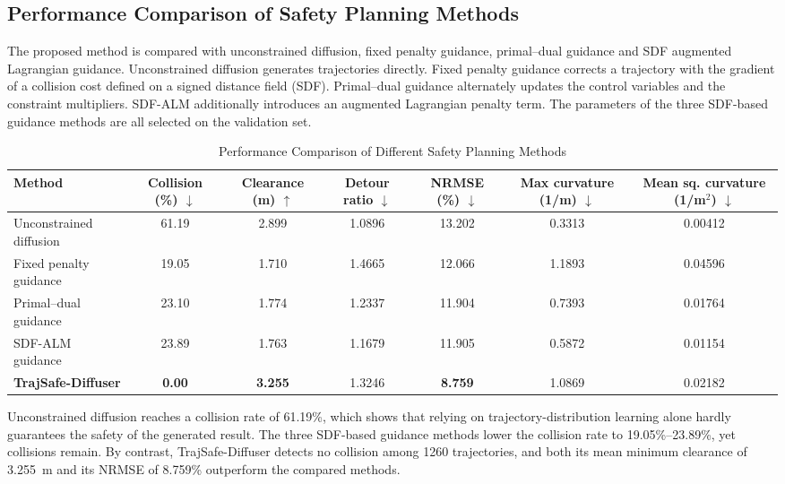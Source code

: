 \documentclass[journal]{IEEEtran}
\begin{document}
\subsection{Performance Comparison of Safety Planning Methods}
The proposed method is compared with unconstrained diffusion, fixed penalty
guidance, primal--dual guidance and SDF augmented Lagrangian guidance.
Unconstrained diffusion generates trajectories directly. Fixed penalty guidance
corrects a trajectory with the gradient of a collision cost defined on a signed
distance field (SDF). Primal--dual guidance alternately updates the control
variables and the constraint multipliers. SDF-ALM additionally introduces an
augmented Lagrangian penalty term. The parameters of the three SDF-based
guidance methods are all selected on the validation set.

\begin{table}[!t]
\caption{Performance Comparison of Different Safety Planning Methods}
\label{tab:methods}
\centering
\footnotesize
\setlength{\tabcolsep}{4pt}
\begin{tabular}{lcccccc}
\hline
Method & Collision (\%) $\downarrow$ & Clearance (m) $\uparrow$ &
Detour ratio $\downarrow$ & NRMSE (\%) $\downarrow$ &
Max curvature (1/m) $\downarrow$ &
Mean sq. curvature (1/m$^2$) $\downarrow$ \\
\hline
Unconstrained diffusion & 61.19 & 2.899 & 1.0896 & 13.202 & 0.3313 & 0.00412 \\
Fixed penalty guidance  & 19.05 & 1.710 & 1.4665 & 12.066 & 1.1893 & 0.04596 \\
Primal--dual guidance   & 23.10 & 1.774 & 1.2337 & 11.904 & 0.7393 & 0.01764 \\
SDF-ALM guidance        & 23.89 & 1.763 & 1.1679 & 11.905 & 0.5872 & 0.01154 \\
\textbf{TrajSafe-Diffuser} & \textbf{0.00} & \textbf{3.255} & 1.3246 &
\textbf{8.759} & 1.0869 & 0.02182 \\
\hline
\end{tabular}
\end{table}

Unconstrained diffusion reaches a collision rate of 61.19\%, which shows that
relying on trajectory-distribution learning alone hardly guarantees the safety of
the generated result. The three SDF-based guidance methods lower the collision
rate to 19.05\%--23.89\%, yet collisions remain. By contrast, TrajSafe-Diffuser
detects no collision among 1260 trajectories, and both its mean minimum
clearance of 3.255~m and its NRMSE of 8.759\% outperform the compared methods.
\end{document}
